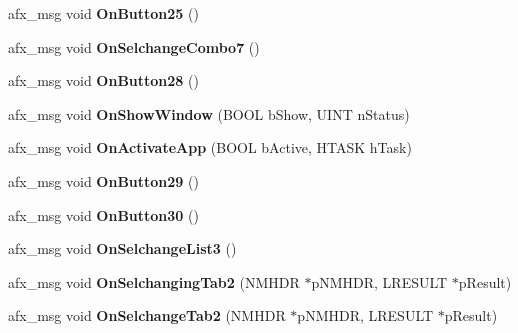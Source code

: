 \begin{DoxyCompactItemize}
\item 
\hypertarget{class_c_wavfrag_dlg_ad2266c8ecb55992b567c32d1ba6cda26}{afx\-\_\-msg void {\bfseries On\-Button25} ()}\label{class_c_wavfrag_dlg_ad2266c8ecb55992b567c32d1ba6cda26}

\item 
\hypertarget{class_c_wavfrag_dlg_aa04884d7aab3ddf986d15eb5f69f5133}{afx\-\_\-msg void {\bfseries On\-Selchange\-Combo7} ()}\label{class_c_wavfrag_dlg_aa04884d7aab3ddf986d15eb5f69f5133}

\item 
\hypertarget{class_c_wavfrag_dlg_aa87bb21155c81ad3283db2e6b9ee68eb}{afx\-\_\-msg void {\bfseries On\-Button28} ()}\label{class_c_wavfrag_dlg_aa87bb21155c81ad3283db2e6b9ee68eb}

\item 
\hypertarget{class_c_wavfrag_dlg_a6a540eaaea388323dfd74b14be5e6f86}{afx\-\_\-msg void {\bfseries On\-Show\-Window} (B\-O\-O\-L b\-Show, U\-I\-N\-T n\-Status)}\label{class_c_wavfrag_dlg_a6a540eaaea388323dfd74b14be5e6f86}

\item 
\hypertarget{class_c_wavfrag_dlg_af0f0694f4ebf2ce59e5eb8493d3e5853}{afx\-\_\-msg void {\bfseries On\-Activate\-App} (B\-O\-O\-L b\-Active, H\-T\-A\-S\-K h\-Task)}\label{class_c_wavfrag_dlg_af0f0694f4ebf2ce59e5eb8493d3e5853}

\item 
\hypertarget{class_c_wavfrag_dlg_a64353e91a4bb747898172eaad0c89b6c}{afx\-\_\-msg void {\bfseries On\-Button29} ()}\label{class_c_wavfrag_dlg_a64353e91a4bb747898172eaad0c89b6c}

\item 
\hypertarget{class_c_wavfrag_dlg_a2f50796b000c19053694346d6d28ff88}{afx\-\_\-msg void {\bfseries On\-Button30} ()}\label{class_c_wavfrag_dlg_a2f50796b000c19053694346d6d28ff88}

\item 
\hypertarget{class_c_wavfrag_dlg_a6fbd88218365f634dcb23c4d4239bae3}{afx\-\_\-msg void {\bfseries On\-Selchange\-List3} ()}\label{class_c_wavfrag_dlg_a6fbd88218365f634dcb23c4d4239bae3}

\item 
\hypertarget{class_c_wavfrag_dlg_ac1402917f6e03eea821b7bca9d54660a}{afx\-\_\-msg void {\bfseries On\-Selchanging\-Tab2} (N\-M\-H\-D\-R $\ast$p\-N\-M\-H\-D\-R, L\-R\-E\-S\-U\-L\-T $\ast$p\-Result)}\label{class_c_wavfrag_dlg_ac1402917f6e03eea821b7bca9d54660a}

\item 
\hypertarget{class_c_wavfrag_dlg_a3e7ab7b5d4b7c58d3e539eb165e69646}{afx\-\_\-msg void {\bfseries On\-Selchange\-Tab2} (N\-M\-H\-D\-R $\ast$p\-N\-M\-H\-D\-R, L\-R\-E\-S\-U\-L\-T $\ast$p\-Result)}\label{class_c_wavfrag_dlg_a3e7ab7b5d4b7c58d3e539eb165e69646}

\end{DoxyCompactItemize}
